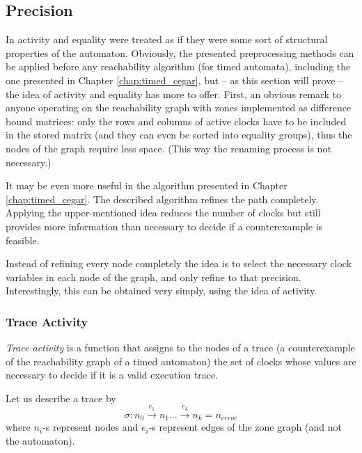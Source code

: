 
\subsection{Precision}

In \cite{RSS96*73} activity and equality were treated as if they were some sort of structural properties of the automaton. Obviously, the presented preprocessing methods can be applied before any reachability algorithm (for timed automata), including the one presented in Chapter \ref{chap:timed_cegar}, but -- as this section will prove -- the idea of activity and equality has more to offer. First, an obvious remark to anyone operating on the reachability graph with zones implemented as difference bound matrices: only the rows and columns of active clocks have to be included in the stored matrix (and they can even be sorted into equality groups), thus the nodes of the graph require less space. (This way the renaming process is not necessary.)

It may be even more useful in the algorithm presented in Chapter \ref{chap:timed_cegar}. The described algorithm refines the path completely. Applying the upper-mentioned idea reduces the number of clocks but still provides more information than necessary to decide if a counterexample is feasible.


Instead of refining every node completely the idea is to select the necessary clock variables in each node of the graph, and only refine to that precision. Interestingly, this can be obtained very simply, using the idea of activity.

\subsubsection{Trace Activity}

\emph{Trace activity} is a function that assigns to the nodes of a trace (a counterexample of the reachability graph of a timed automaton) the set of clocks whose values are necessary to decide if it is a valid execution trace.

Let us describe a trace by \[\sigma : n_0 \xrightarrow{e_1} n_1 \dots \xrightarrow{e_k} n_k=n_{error}\] where $n_i$-s represent nodes and $e_i$-s represent edges of the zone graph (and not the automaton).


